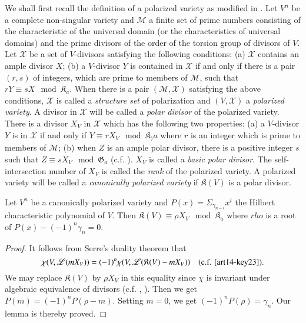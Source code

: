We shall first recall the definition of a polarized variety as modified in \cite{art14-key16}. Let $V^{n}$ be a complete non-singular variety and $\mathscr{M}$ a finite set of prime numbers consisting of the characteristic of the universal domain (or the characteristics of universal domains) and the prime divisors of the order of the torsion group of divisors of $V$. Let $\mathscr{X}$ be a set of $V$-divisors satisfying the following conditions: (a) $\mathscr{X}$ contains an ample divisor $X$; (b) a $V$-divisor $Y$ is contained in $\mathscr{X}$ if and only if there is a pair $(r,s)$ of integers, which are prime to members of $\mathscr{M}$, such that $rY\equiv sX\mod \mathfrak{K}_{a}$. When there is a pair $(\mathscr{M},\mathscr{X})$ satisfying the above conditions, $\mathscr{X}$ is called a {\em structure set} of polarization and $(V,\mathscr{X})$ a {\em polarized variety}. A divisor in $\mathscr{X}$ will be called a {\em polar divisor} of the polarized variety. There is a divisor $X_{V}$ in $\mathscr{X}$ which has the following two properties: (a) a $V$-divisor $Y$ is in $\mathscr{X}$ if and only if $Y\equiv rX_{V}\mod \mathfrak{K}_){a}$ where $r$ is an integer which is prime to members of $\mathscr{M}$; (b) when $Z$ is an ample polar divisor, there is a positive integer $s$ such that $Z\equiv sX_{V}\mod \mathfrak{G}_{a}$ (c.f. \cite{art14-key16}). $X_{V}$ is called a {\em basic polar divisor}. The self-intersection number of $X_{V}$ is called the {\em rank} of the polarized variety. A polarized variety will be called a {\em canonically polarized variety} if $\mathfrak{K}(V)$ is a polar divisor.

\begin{lemma}\label{art14-lem1}
Let $V^{n}$ be a canonically polarized variety and $P(x)=\Sigma_{\gamma_{n-i}}x^{i}$ the Hilbert characteristic polynomial of $V$. Then $\mathfrak{K}(V)\equiv \rho X_{V}\mod \mathfrak{K}_{a}$ where $rho$ is a root of $P(x)-(-1)^{n}\gamma_{n}=0$.
\end{lemma}

\begin{proof}
It follows from Serre's duality theorem that 
$$
\chi(V,\mathscr{L}(mX_{V}))=(-1)^{n}\chi(V,\mathscr{L}(\mathfrak{K}(V)-mX_{V}))\quad (\text{c.f. \cite{art14-key23}}).
$$\pageoriginale
We may replace $\mathfrak{K}(V)$ by $\rho X_{V}$ in this equality since $\chi$ is invariant under algebraic equivalence of divisors (c.f. \cite{art14-key4}, \cite{art14-key16}). Then we get $P(m)=(-1)^{n}P(\rho-m)$. Setting $m=0$, we get $(-1)^{n}P(\rho)=\gamma_{n}$. Our lemma is thereby proved.
\end{proof}

